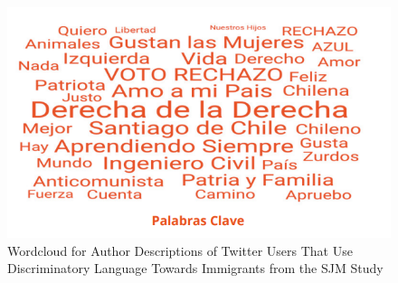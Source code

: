        \begin{figure}[!htb]
             \centering
             \includegraphics[width=.8\linewidth]{figs/WordCloud_Study.png}
             \caption{Wordcloud for Author Descriptions of Twitter Users That Use Discriminatory Language Towards Immigrants from the SJM Study}
             \label{appfig_cloud_SJM}
        \end{figure}
    
